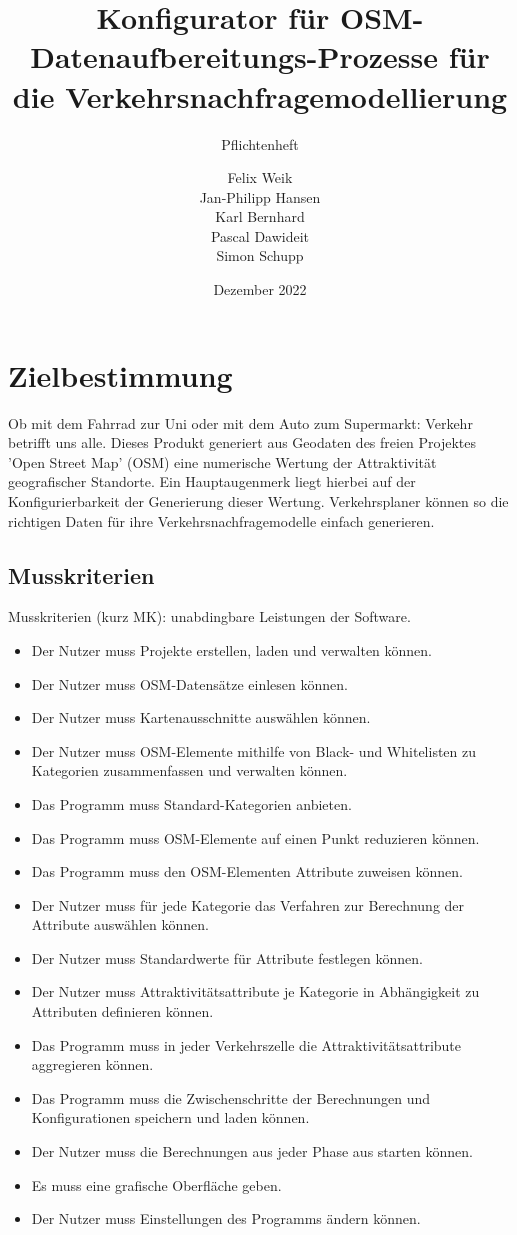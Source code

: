 \documentclass[parskip=full]{scrartcl} %
\title{Konfigurator für OSM-Datenaufbereitungs-Prozesse für die Verkehrsnachfragemodellierung}
\subtitle{Pflichtenheft}
\author{Felix Weik\\ Jan-Philipp Hansen\\ Karl Bernhard\\ Pascal Dawideit\\ Simon Schupp}
\date{Dezember 2022}
\begin{document}
\maketitle
\newpage

\tableofcontents
\newpage




\section{Zielbestimmung}
Ob mit dem Fahrrad zur Uni oder mit dem Auto zum Supermarkt: Verkehr betrifft uns alle. Dieses Produkt generiert aus Geodaten des freien Projektes 'Open Street Map' (OSM) eine numerische Wertung der Attraktivität geografischer Standorte. Ein Hauptaugenmerk liegt hierbei auf der Konfigurierbarkeit der Generierung dieser Wertung. Verkehrsplaner können so die richtigen Daten für ihre Verkehrsnachfragemodelle einfach generieren.

\subsection{Musskriterien}
Musskriterien (kurz MK): unabdingbare Leistungen der Software.

\begin{itemize}
    \item <MK1> Der Nutzer muss Projekte erstellen, laden und verwalten können.
    \item <MK2> Der Nutzer muss OSM-Datensätze einlesen können.
    \item <MK3> Der Nutzer muss Kartenausschnitte auswählen können.
    \item <MK4> Der Nutzer muss OSM-Elemente mithilfe von Black- und Whitelisten zu Kategorien zusammenfassen und verwalten können.
    \item <MK5> Das Programm muss Standard-Kategorien anbieten.
    \item <MK6> Das Programm muss OSM-Elemente auf einen Punkt reduzieren können.
    \item <MK7> Das Programm muss den OSM-Elementen Attribute zuweisen können.
    \item <MK8> Der Nutzer muss für jede Kategorie das Verfahren zur Berechnung der Attribute auswählen können.
    \item <MK9> Der Nutzer muss Standardwerte für Attribute festlegen können.
    \item <MK10> Der Nutzer muss Attraktivitätsattribute je Kategorie in Abhängigkeit zu Attributen definieren können.
    \item <MK11> Das Programm muss in jeder Verkehrszelle die Attraktivitätsattribute aggregieren können.
    \item <MK12> Das Programm muss die Zwischenschritte der Berechnungen und Konfigurationen speichern und laden können.
    \item <MK13> Der Nutzer muss die Berechnungen aus jeder Phase aus starten können.
    \item <MK14> Es muss eine grafische Oberfläche geben.
    \item <MK15> Der Nutzer muss Einstellungen des Programms ändern können.
\end{itemize}
\end{document}
